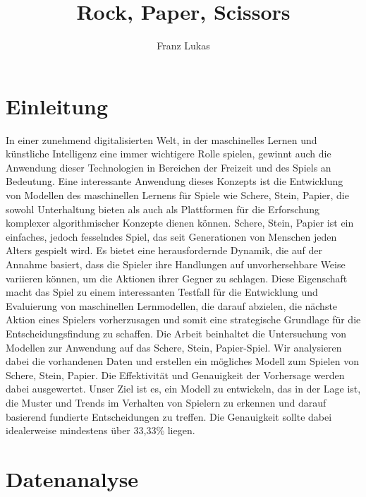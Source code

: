 \documentclass[thesis=paper,fancy]{hsmw-thesis}
\title[Inbetreibnahme]{Rock, Paper, Scissors}
\author{Franz Lukas}{Mehlhorn}[B.Eng.]
\begin{document}
\chapter{Einleitung}
In einer zunehmend digitalisierten Welt, in der maschinelles Lernen und künstliche Intelligenz eine immer wichtigere Rolle spielen, gewinnt auch die Anwendung dieser Technologien in Bereichen der Freizeit und des Spiels an Bedeutung. Eine interessante Anwendung dieses Konzepts ist die Entwicklung von Modellen des maschinellen Lernens für Spiele wie Schere, Stein, Papier, die sowohl Unterhaltung bieten als auch als Plattformen für die Erforschung komplexer algorithmischer Konzepte dienen können.
Schere, Stein, Papier ist ein einfaches, jedoch fesselndes Spiel, das seit Generationen von Menschen jeden Alters gespielt wird. Es bietet eine herausfordernde Dynamik, die auf der Annahme basiert, dass die Spieler ihre Handlungen auf unvorhersehbare Weise variieren können, um die Aktionen ihrer Gegner zu schlagen. Diese Eigenschaft macht das Spiel zu einem interessanten Testfall für die Entwicklung und Evaluierung von maschinellen Lernmodellen, die darauf abzielen, die nächste Aktion eines Spielers vorherzusagen und somit eine strategische Grundlage für die Entscheidungsfindung zu schaffen.
Die Arbeit beinhaltet die Untersuchung von Modellen zur Anwendung auf das Schere, Stein, Papier-Spiel. Wir analysieren dabei die vorhandenen Daten und erstellen ein mögliches Modell zum Spielen von Schere, Stein, Papier. Die Effektivität und Genauigkeit der Vorhersage werden dabei ausgewertet. 
Unser Ziel ist es, ein Modell zu entwickeln, das in der Lage ist, die Muster und Trends im Verhalten von Spielern zu erkennen und darauf basierend fundierte Entscheidungen zu treffen. Die Genauigkeit sollte dabei idealerweise mindestens über 33,33\% liegen.

\chapter{Datenanalyse}
\end{document}
